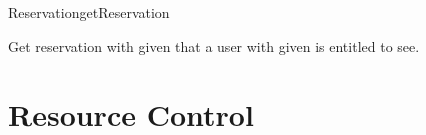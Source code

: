 \begin{Api}
\begin{ApiCmd}{Reservation}{getReservation}%
%
%
\end{ApiCmd}
Get reservation with given  that a user with given  is entitled to see.

\end{Api}

\section{Resource Control}

\todo{}



